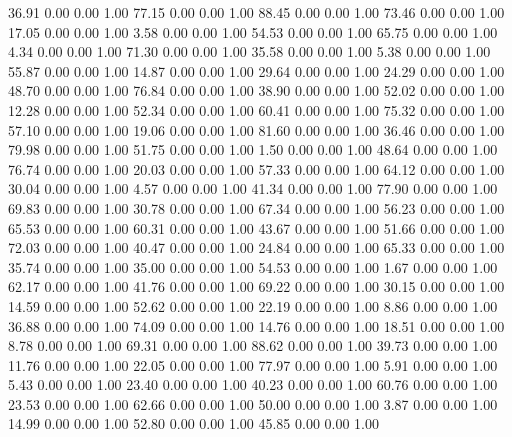    36.91   0.00   0.00   1.00
   77.15   0.00   0.00   1.00
   88.45   0.00   0.00   1.00
   73.46   0.00   0.00   1.00
   17.05   0.00   0.00   1.00
    3.58   0.00   0.00   1.00
   54.53   0.00   0.00   1.00
   65.75   0.00   0.00   1.00
    4.34   0.00   0.00   1.00
   71.30   0.00   0.00   1.00
   35.58   0.00   0.00   1.00
    5.38   0.00   0.00   1.00
   55.87   0.00   0.00   1.00
   14.87   0.00   0.00   1.00
   29.64   0.00   0.00   1.00
   24.29   0.00   0.00   1.00
   48.70   0.00   0.00   1.00
   76.84   0.00   0.00   1.00
   38.90   0.00   0.00   1.00
   52.02   0.00   0.00   1.00
   12.28   0.00   0.00   1.00
   52.34   0.00   0.00   1.00
   60.41   0.00   0.00   1.00
   75.32   0.00   0.00   1.00
   57.10   0.00   0.00   1.00
   19.06   0.00   0.00   1.00
   81.60   0.00   0.00   1.00
   36.46   0.00   0.00   1.00
   79.98   0.00   0.00   1.00
   51.75   0.00   0.00   1.00
    1.50   0.00   0.00   1.00
   48.64   0.00   0.00   1.00
   76.74   0.00   0.00   1.00
   20.03   0.00   0.00   1.00
   57.33   0.00   0.00   1.00
   64.12   0.00   0.00   1.00
   30.04   0.00   0.00   1.00
    4.57   0.00   0.00   1.00
   41.34   0.00   0.00   1.00
   77.90   0.00   0.00   1.00
   69.83   0.00   0.00   1.00
   30.78   0.00   0.00   1.00
   67.34   0.00   0.00   1.00
   56.23   0.00   0.00   1.00
   65.53   0.00   0.00   1.00
   60.31   0.00   0.00   1.00
   43.67   0.00   0.00   1.00
   51.66   0.00   0.00   1.00
   72.03   0.00   0.00   1.00
   40.47   0.00   0.00   1.00
   24.84   0.00   0.00   1.00
   65.33   0.00   0.00   1.00
   35.74   0.00   0.00   1.00
   35.00   0.00   0.00   1.00
   54.53   0.00   0.00   1.00
    1.67   0.00   0.00   1.00
   62.17   0.00   0.00   1.00
   41.76   0.00   0.00   1.00
   69.22   0.00   0.00   1.00
   30.15   0.00   0.00   1.00
   14.59   0.00   0.00   1.00
   52.62   0.00   0.00   1.00
   22.19   0.00   0.00   1.00
    8.86   0.00   0.00   1.00
   36.88   0.00   0.00   1.00
   74.09   0.00   0.00   1.00
   14.76   0.00   0.00   1.00
   18.51   0.00   0.00   1.00
    8.78   0.00   0.00   1.00
   69.31   0.00   0.00   1.00
   88.62   0.00   0.00   1.00
   39.73   0.00   0.00   1.00
   11.76   0.00   0.00   1.00
   22.05   0.00   0.00   1.00
   77.97   0.00   0.00   1.00
    5.91   0.00   0.00   1.00
    5.43   0.00   0.00   1.00
   23.40   0.00   0.00   1.00
   40.23   0.00   0.00   1.00
   60.76   0.00   0.00   1.00
   23.53   0.00   0.00   1.00
   62.66   0.00   0.00   1.00
   50.00   0.00   0.00   1.00
    3.87   0.00   0.00   1.00
   14.99   0.00   0.00   1.00
   52.80   0.00   0.00   1.00
   45.85   0.00   0.00   1.00
